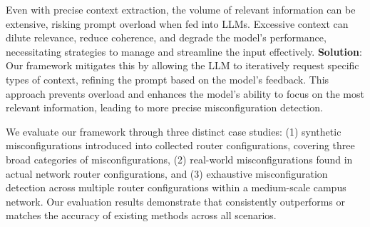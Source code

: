 Even with precise context extraction, the volume of relevant information can be extensive, risking prompt overload when fed into LLMs. Excessive context can dilute relevance, reduce coherence, and degrade the model’s performance, necessitating strategies to manage and streamline the input effectively. \textbf{Solution}: Our framework mitigates this by allowing the LLM to iteratively request specific types of context, refining the prompt based on the model’s feedback. This approach prevents overload and enhances the model’s ability to focus on the most relevant information, leading to more precise misconfiguration detection.

We evaluate our framework through three distinct case studies: (1) synthetic misconfigurations introduced into collected router configurations, covering three broad categories of misconfigurations, (2) real-world misconfigurations found in actual network router configurations, and (3) exhaustive misconfiguration detection across multiple router configurations within a medium-scale campus network. Our evaluation results demonstrate that \sysname{} consistently outperforms or matches the accuracy of existing methods across all scenarios.

